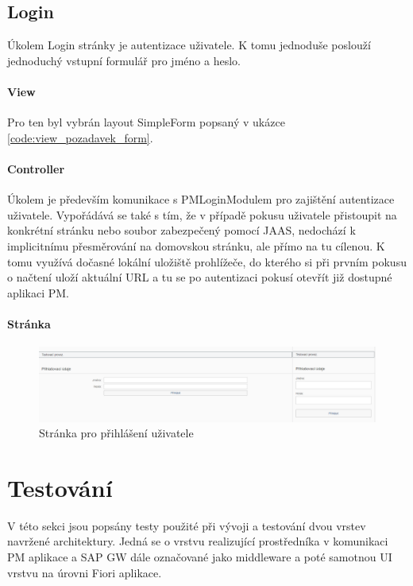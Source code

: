 \documentclass[thesis=M,czech]{FITthesis}[2012/06/26]
\begin{document}
\subsection{Login}
Úkolem Login stránky je autentizace uživatele. K tomu jednoduše poslouží jednoduchý vstupní formulář pro jméno a heslo.
\paragraph{View}
Pro ten byl vybrán layout SimpleForm popsaný v ukázce \ref{code:view_pozadavek_form}. 
\paragraph{Controller}
Úkolem je především komunikace s PMLoginModulem pro zajištění autentizace uživatele. Vypořádává se také s tím, že v případě pokusu uživatele přistoupit na konkrétní stránku nebo soubor zabezpečený pomocí JAAS, nedochází k implicitnímu přesměrování na domovskou stránku, ale přímo na tu cílenou. K tomu využívá dočasné lokální uložiště prohlížeče, do kterého si při prvním pokusu o načtení uloží aktuální URL a tu se po autentizaci pokusí otevřít již dostupné aplikaci PM.
\paragraph{Stránka}
\begin{figure}[H]
	\centering
	\includegraphics[width=1\textwidth]{images/view_login}
	\caption{Stránka pro přihlášení uživatele}
	\label{img:view_login}
\end{figure}

\section{Testování}
V této sekci jsou popsány testy použité při vývoji a testování dvou vrstev navržené architektury. Jedná se o vrstvu realizující prostředníka v komunikaci PM aplikace a SAP GW dále označované jako middleware a poté samotnou UI vrstvu na úrovni Fiori aplikace.
\end{document}
